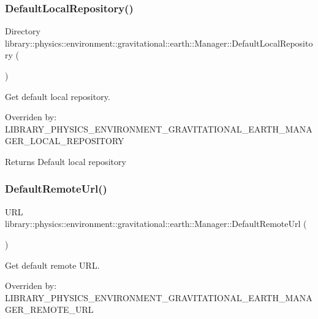 \subsubsection{\texorpdfstring{Default\+Local\+Repository()}{DefaultLocalRepository()}}
{\footnotesize\ttfamily Directory library\+::physics\+::environment\+::gravitational\+::earth\+::\+Manager\+::\+Default\+Local\+Repository (\begin{DoxyParamCaption}{ }\end{DoxyParamCaption})\hspace{0.3cm}{\ttfamily [static]}}



Get default local repository. 

Overriden by\+: L\+I\+B\+R\+A\+R\+Y\+\_\+\+P\+H\+Y\+S\+I\+C\+S\+\_\+\+E\+N\+V\+I\+R\+O\+N\+M\+E\+N\+T\+\_\+\+G\+R\+A\+V\+I\+T\+A\+T\+I\+O\+N\+A\+L\+\_\+\+E\+A\+R\+T\+H\+\_\+\+M\+A\+N\+A\+G\+E\+R\+\_\+\+L\+O\+C\+A\+L\+\_\+\+R\+E\+P\+O\+S\+I\+T\+O\+RY

\begin{DoxyReturn}{Returns}
Default local repository 
\end{DoxyReturn}
\mbox{\label{classlibrary_1_1physics_1_1environment_1_1gravitational_1_1earth_1_1_manager_a3607f55dff9310917a9036ee107be14e}} 
\subsubsection{\texorpdfstring{Default\+Remote\+Url()}{DefaultRemoteUrl()}}
{\footnotesize\ttfamily U\+RL library\+::physics\+::environment\+::gravitational\+::earth\+::\+Manager\+::\+Default\+Remote\+Url (\begin{DoxyParamCaption}{ }\end{DoxyParamCaption})\hspace{0.3cm}{\ttfamily [static]}}



Get default remote U\+RL. 

Overriden by\+: L\+I\+B\+R\+A\+R\+Y\+\_\+\+P\+H\+Y\+S\+I\+C\+S\+\_\+\+E\+N\+V\+I\+R\+O\+N\+M\+E\+N\+T\+\_\+\+G\+R\+A\+V\+I\+T\+A\+T\+I\+O\+N\+A\+L\+\_\+\+E\+A\+R\+T\+H\+\_\+\+M\+A\+N\+A\+G\+E\+R\+\_\+\+R\+E\+M\+O\+T\+E\+\_\+\+U\+RL


